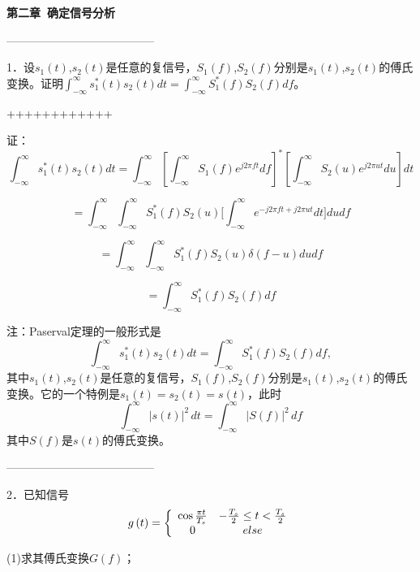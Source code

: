 \documentclass[utf8]{article}
\begin{document}
\begin{center}
\Large\bfseries{第二章\ 确定信号分析 }
\end{center}
---------------------------------------

1．设$s_{1}\left(t\right)$,$s_{2}\left(t\right)$是任意的复信号，$S_{1}\left(f\right)$,$S_{2}\left(f\right)$分别是$s_{1}\left(t\right)$,$s_{2}\left(t\right)$的傅氏变换。证明$\textstyle{\int_{-\infty}^{\infty}s_{1}^{*}\left(t\right)s_{2}\left(t\right)d t}=\textstyle{\int_{-\infty}^{\infty}S_{1}^{*}\left(f\right)S_{2}\left(f\right)d f}$。

++++++++++++

证：
$$
\int_{-\infty}^{\infty}s_{1}^{*}\left(t\right)s_{2}\left(t\right)d t = \left.\int_{-\infty}^{\infty}\left[\right.\int_{-\infty}^{\infty}S_{1}\left(f\right)e^{j2\pi f t}d f\right]^{\ast}\left[\int_{-\infty}^{\infty}S_{2}\left(u\right)e^{j2\pi u t}d u\right]dt
$$

$$
=\int_{-\infty}^{\infty}\int_{-\infty}^{\infty} S_{1}^{*}\left(f\right)S_{2}\left(u\right)\biggl[\int_{-\infty}^{\infty}e^{-j2\pi f t+j2\pi u t}d t\biggr]d u d f
$$

$$=\int_{-\infty}^{\infty}\int_{-\infty}^{\infty}S_{1}^{*}\left(f\right)S_{2}\left(u\right)\delta\left(f-u\right)d u d f$$

$$=\int_{-\infty}^{\infty}S_{1}^{*}\left(f\right)S_{2}\left(f\right)d f$$

注：Paserval定理的一般形式是$$\textstyle{\int_{-\infty}^{\infty}s_{1}^{*}\left(t\right)s_{2}\left(t\right)d t}=\textstyle{\int_{-\infty}^{\infty}S_{1}^{*}\left(f\right)S_{2}\left(f\right)d f},$$
其中$s_{1}\left(t\right)$,$s_{2}\left(t\right)$是任意的复信号，$S_{1}\left(f\right)$,$S_{2}\left(f\right)$分别是$s_{1}\left(t\right)$,$s_{2}\left(t\right)$的傅氏变换。它的一个特例是$s_{1}\left(t\right)=s_{2}\left(t\right)=s\left(t\right)$，此时$$\textstyle{\int_{-\infty}^{\infty}}\left|s\left(t\right)\right|^{2}\,d t=\int_{-\infty}^{\infty}\left|S\left(f\right)\right|^{2}\,d f$$
其中$S\left(f\right)$是$s\left(t\right)$的傅氏变换。

---------------------------------------

2．已知信号
$$
g\left(t\right)=\left\{\begin{array}{c c}{{\cos\frac{\pi t}{T_{s}}}}&{{-\frac{T_{s}}{2}\leq t< \frac{T_{s}}{2}}}\\ {{0}}&{{e l s e}}\end{array}\right.
$$

(1)求其傅氏变换$G(f)$； 
\end{document}
